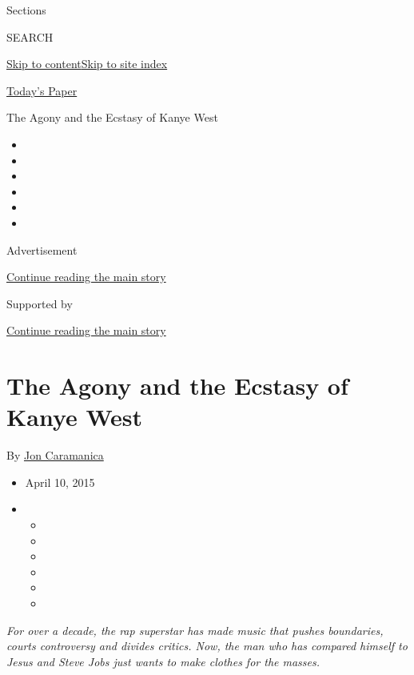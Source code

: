 Sections

SEARCH

\protect\hyperlink{site-content}{Skip to
content}\protect\hyperlink{site-index}{Skip to site index}

\href{https://myaccount.nytimes3xbfgragh.onion/auth/login?response_type=cookie\&client_id=vi}{}

\href{https://www.nytimes3xbfgragh.onion/section/todayspaper}{Today's
Paper}

The Agony and the Ecstasy of Kanye West

\begin{itemize}
\item
\item
\item
\item
\item
\item
\end{itemize}

Advertisement

\protect\hyperlink{after-top}{Continue reading the main story}

Supported by

\protect\hyperlink{after-sponsor}{Continue reading the main story}

\hypertarget{the-agony-and-the-ecstasy-of-kanye-west}{%
\section{The Agony and the Ecstasy of Kanye
West}\label{the-agony-and-the-ecstasy-of-kanye-west}}

By \href{http://www.nytimes3xbfgragh.onion/by/jon-caramanica}{Jon
Caramanica}

\begin{itemize}
\item
  April 10, 2015
\item
  \begin{itemize}
  \item
  \item
  \item
  \item
  \item
  \item
  \end{itemize}
\end{itemize}

\emph{For over a decade, the rap superstar has made music that pushes
boundaries, courts controversy and divides critics. Now, the man who has
compared himself to Jesus and Steve Jobs just wants to make clothes for
the masses.}

